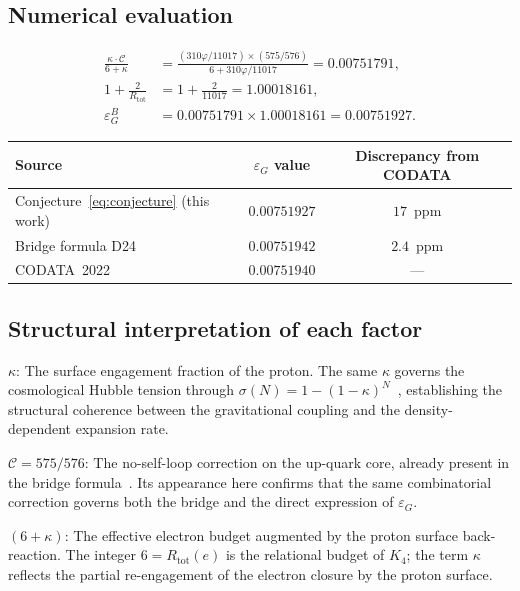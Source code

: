 \documentclass[11pt,a4paper]{article}
\theoremstyle{definition}
\newcommand{\Rtot}{R_{\mathrm{tot}}}
\newcommand{\epsg}{\varepsilon_G}
\newcommand{\Kfour}{K_4}
\newcommand{\calC}{\mathcal{C}}
\newcommand{\vp}{\varphi}
\newcommand{\kap}{\kappa}
\newcommand{\sig}{\sigma}
\begin{document}
\subsection{Numerical evaluation}
\label{subsec:numerical}

\begin{align}
\frac{\kap\cdot\calC}{6+\kap} &= \frac{(310\vp/11017)\times(575/576)}{6 + 310\vp/11017} = 0.00751791, \label{eq:step1}\\
1 + \frac{2}{\Rtot} &= 1 + \frac{2}{11017} = 1.00018161, \label{eq:step2}\\
\epsg^B &= 0.00751791 \times 1.00018161 = 0.00751927. \label{eq:product}
\end{align}

\begin{center}
\begin{tabular}{lcc}
\toprule
Source & $\epsg$ value & Discrepancy from CODATA \\
\midrule
Conjecture~\eqref{eq:conjecture} (this work) & $0.00751927$ & $17$~ppm \\
Bridge formula D24~\cite{Bridge_PDL_2026} & $0.00751942$ & $2.4$~ppm \\
CODATA~2022~\cite{CODATA_2022} & $0.00751940$ & --- \\
\bottomrule
\end{tabular}
\end{center}

\subsection{Structural interpretation of each factor}
\label{subsec:factors}

\medskip\noindent\textbf{$\kap$}: The surface engagement fraction of the proton. The same $\kap$ governs the cosmological Hubble tension through $\sig(N) = 1-(1-\kap)^N$~\cite{Hubble_Resolution_PDL_2026,NCMB_PDL_2026}, establishing the structural coherence between the gravitational coupling and the density-dependent expansion rate.

\medskip\noindent\textbf{$\calC = 575/576$}: The no-self-loop correction on the up-quark core, already present in the bridge formula~\cite{Bridge_PDL_2026}. Its appearance here confirms that the same combinatorial correction governs both the bridge and the direct expression of $\epsg$.

\medskip\noindent\textbf{$(6+\kap)$}: The effective electron budget augmented by the proton surface back-reaction. The integer $6 = \Rtot(e)$ is the relational budget of $\Kfour$; the term $\kap$ reflects the partial re-engagement of the electron closure by the proton surface.
\end{document}
